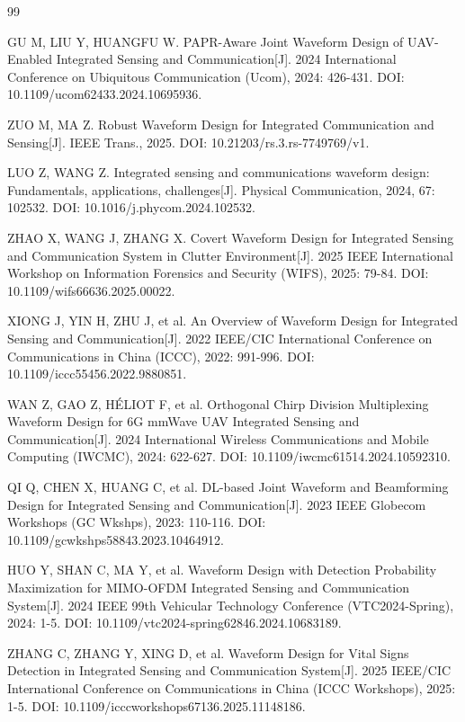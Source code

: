 \begin{thebibliography}{99}

GU M, LIU Y, HUANGFU W. PAPR-Aware Joint Waveform Design of UAV-Enabled Integrated Sensing and Communication[J]. 2024 International Conference on Ubiquitous Communication (Ucom), 2024: 426-431. DOI: 10.1109/ucom62433.2024.10695936.

ZUO M, MA Z. Robust Waveform Design for Integrated Communication and Sensing[J]. IEEE Trans., 2025. DOI: 10.21203/rs.3.rs-7749769/v1.

LUO Z, WANG Z. Integrated sensing and communications waveform design: Fundamentals, applications, challenges[J]. Physical Communication, 2024, 67: 102532. DOI: 10.1016/j.phycom.2024.102532.

ZHAO X, WANG J, ZHANG X. Covert Waveform Design for Integrated Sensing and Communication System in Clutter Environment[J]. 2025 IEEE International Workshop on Information Forensics and Security (WIFS), 2025: 79-84. DOI: 10.1109/wifs66636.2025.00022.

XIONG J, YIN H, ZHU J, et al. An Overview of Waveform Design for Integrated Sensing and Communication[J]. 2022 IEEE/CIC International Conference on Communications in China (ICCC), 2022: 991-996. DOI: 10.1109/iccc55456.2022.9880851.

WAN Z, GAO Z, HÉLIOT F, et al. Orthogonal Chirp Division Multiplexing Waveform Design for 6G mmWave UAV Integrated Sensing and Communication[J]. 2024 International Wireless Communications and Mobile Computing (IWCMC), 2024: 622-627. DOI: 10.1109/iwcmc61514.2024.10592310.

QI Q, CHEN X, HUANG C, et al. DL-based Joint Waveform and Beamforming Design for Integrated Sensing and Communication[J]. 2023 IEEE Globecom Workshops (GC Wkshps), 2023: 110-116. DOI: 10.1109/gcwkshps58843.2023.10464912.

HUO Y, SHAN C, MA Y, et al. Waveform Design with Detection Probability Maximization for MIMO-OFDM Integrated Sensing and Communication System[J]. 2024 IEEE 99th Vehicular Technology Conference (VTC2024-Spring), 2024: 1-5. DOI: 10.1109/vtc2024-spring62846.2024.10683189.

ZHANG C, ZHANG Y, XING D, et al. Waveform Design for Vital Signs Detection in Integrated Sensing and Communication System[J]. 2025 IEEE/CIC International Conference on Communications in China (ICCC Workshops), 2025: 1-5. DOI: 10.1109/icccworkshops67136.2025.11148186.


\end{thebibliography}
